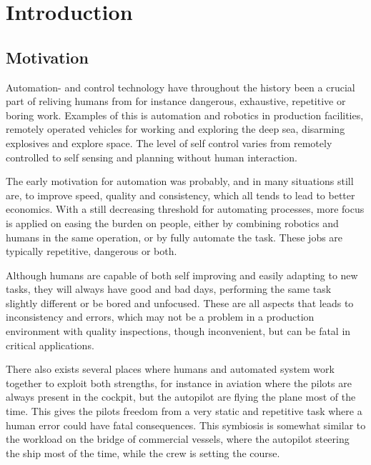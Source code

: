 
\chapter{Introduction}\label{chapter:introduction}
\section{Motivation}\label{sec:motivation}
Automation- and control technology have throughout the history been a crucial part of reliving humans from for instance dangerous, exhaustive, repetitive or boring work. Examples of this is automation and robotics in production facilities, remotely operated vehicles for working and exploring the deep sea, disarming explosives and explore space. The level of self control varies from remotely controlled to self sensing and planning without human interaction.

The early motivation for automation was probably, and in many situations still are, to improve speed, quality and consistency, which all tends to lead to better economics. With a still decreasing threshold for automating processes, more focus is applied on easing the burden on people, either by combining robotics and humans in the same operation, or by fully automate the task. These jobs are typically repetitive, dangerous or both.

Although humans are capable of both self improving and easily adapting to new tasks, they will always have good and bad days, performing the same task slightly different or be bored and unfocused. These are all aspects that leads to inconsistency and errors, which may not be a problem in a production environment with quality inspections, though inconvenient, but can be fatal in critical applications. 

There also exists several places where humans and automated system work together to exploit both strengths, for instance in aviation where the pilots are always present in the cockpit, but the autopilot are flying the plane most of the time. This gives the pilots freedom from a very static and repetitive task where a human error could have fatal consequences. This symbiosis is somewhat similar to the workload on the bridge of commercial vessels, where the autopilot steering the ship most of the time, while the crew is setting the course. 

